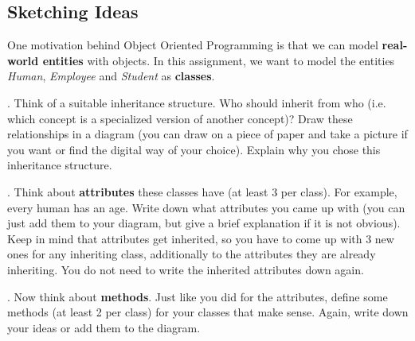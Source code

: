 
\subsection{Sketching Ideas}

One motivation behind Object Oriented Programming is that we can model {\bf real-world entities} with objects. In this assignment, we want to model the entities {\it Human}, {\it Employee} and {\it Student} as {\bf classes}.

\vspace{1em}

. Think of a suitable inheritance structure. Who should inherit from who (i.e. which concept is a specialized version of another concept)? Draw these relationships in a diagram (you can draw on a piece of paper and take a picture if you want or find the digital way of your choice). Explain why you chose this inheritance structure.

\vspace{1em}

. Think about {\bf attributes} these classes have (at least 3 per class). For example, every human has an age. Write down what attributes you came up with (you can just add them to your diagram, but give a brief explanation if it is not obvious). Keep in mind that attributes get inherited, so you have to come up with 3 new ones for any inheriting class, additionally to the attributes they are already inheriting. You do not need to write the inherited attributes down again.

\vspace{1em}

. Now think about {\bf methods}. Just like you did for the attributes, define some methods (at least 2 per class) for your classes that make sense. Again, write down your ideas or add them to the diagram.

\vspace{1em}

